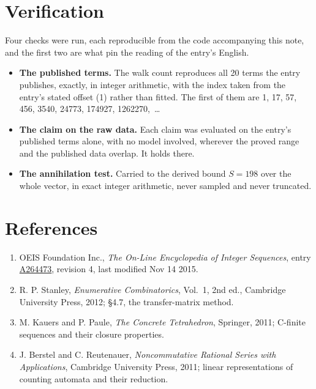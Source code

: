 \documentclass[11pt]{article}
\theoremstyle{definition}
\begin{document}
\section{Verification}

Four checks were run, each reproducible from the code accompanying this note, and the first two are what pin the reading of the entry's English.

\begin{itemize}

\item {\bfseries The published terms.} The walk count reproduces all 20 terms the entry publishes, exactly, in integer arithmetic, with the index taken from the entry's stated offset (1) rather than fitted. The first of them are 1, 17, 57, 456, 3540, 24773, 174927, 1262270,~\dots

\item {\bfseries The claim on the raw data.} Each claim was evaluated on the entry's published terms alone, with no model involved, wherever the proved range and the published data overlap. It holds there.

\item {\bfseries The annihilation test.} Carried to the derived bound $S = 198$ over the whole vector, in exact integer arithmetic, never sampled and never truncated.

\end{itemize}

\section{References}

\begin{enumerate}

\item OEIS Foundation Inc., \emph{The On-Line Encyclopedia of Integer Sequences}, entry \href{https://oeis.org/A264473}{A264473}, revision 4, last modified Nov 14 2015.

\item R. P. Stanley, \emph{Enumerative Combinatorics}, Vol.~1, 2nd ed., Cambridge University Press, 2012; \S4.7, the transfer-matrix method.

\item M. Kauers and P. Paule, \emph{The Concrete Tetrahedron}, Springer, 2011; C-finite sequences and their closure properties.

\item J. Berstel and C. Reutenauer, \emph{Noncommutative Rational Series with Applications}, Cambridge University Press, 2011; linear representations of counting automata and their reduction.

\end{enumerate}
\end{document}
